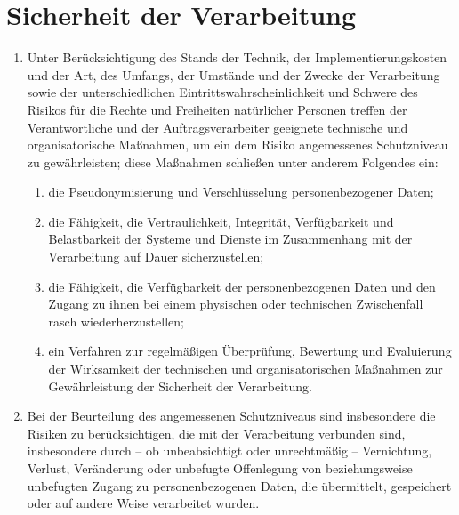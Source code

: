 \chapter{Sicherheit der Verarbeitung}
\label{ch:32}


\begin{enumerate}

  \item Unter Berücksichtigung des Stands der Technik, der Implementierungskosten und der Art, des Umfangs, der Umstände
   und der Zwecke der Verarbeitung sowie der unterschiedlichen Eintrittswahrscheinlichkeit und Schwere des Risikos für
   die Rechte und Freiheiten natürlicher Personen treffen der Verantwortliche und der Auftragsverarbeiter geeignete
   technische und organisatorische Maßnahmen, um ein dem Risiko angemessenes Schutzniveau zu gewährleisten; diese
   Maßnahmen schließen unter anderem Folgendes ein:
  \label{itm:32-1}

  \begin{enumerate}
  
    \item die Pseudonymisierung und Verschlüsselung personenbezogener Daten;
    \label{itm:32-1a}

    \item die Fähigkeit, die Vertraulichkeit, Integrität, Verfügbarkeit und Belastbarkeit der Systeme und Dienste im
     Zusammenhang mit der Verarbeitung auf Dauer sicherzustellen;
    \label{itm:32-1b}

    \item die Fähigkeit, die Verfügbarkeit der personenbezogenen Daten und den Zugang zu ihnen bei einem physischen oder
     technischen Zwischenfall rasch wiederherzustellen;
    \label{itm:32-1c}

    \item ein Verfahren zur regelmäßigen Überprüfung, Bewertung und Evaluierung der Wirksamkeit der technischen und
     organisatorischen Maßnahmen zur Gewährleistung der Sicherheit der Verarbeitung.
    \label{itm:32-1d}

  \end{enumerate}

  \item Bei der Beurteilung des angemessenen Schutzniveaus sind insbesondere die Risiken zu berücksichtigen, die mit der
   Verarbeitung verbunden sind, insbesondere durch -- ob unbeabsichtigt oder unrechtmäßig -- Vernichtung, Verlust,
   Veränderung oder unbefugte Offenlegung von beziehungsweise unbefugten Zugang zu personenbezogenen Daten, die
   übermittelt, gespeichert oder auf andere Weise verarbeitet wurden.
  \label{itm:32-2}


\end{enumerate}
